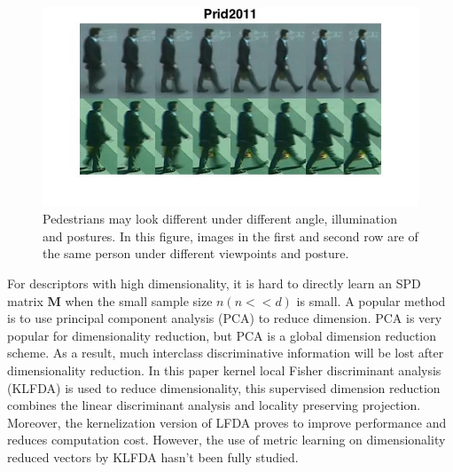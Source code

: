 \documentclass[10pt,twocolumn,letterpaper]{article}
\begin{document}
\begin{figure} 
\centering
\includegraphics[width=1\linewidth]{DisimilarIntra.jpg}
\vspace{-2em}
\caption{Pedestrians may look different under different angle, illumination and postures. In this figure, images in the first and second row are of the same person under different viewpoints and posture.}
\label{DisimilarIntra}
\end{figure}
\indent For descriptors with high dimensionality, it is hard to directly learn an SPD matrix $\bm{M}$ when the small sample size $n (n<<d)$ is small. A popular method is to use principal component analysis (PCA) to reduce dimension. PCA is very popular for dimensionality reduction, but PCA is a global dimension reduction scheme. As a result, much interclass discriminative information will be lost after dimensionality reduction. In this paper kernel local Fisher discriminant analysis (KLFDA) \cite{KernelVersionMetrics} is used to reduce dimensionality, this supervised dimension reduction combines the linear discriminant analysis and locality preserving projection. Moreover, the kernelization version of LFDA proves to improve performance and reduces computation cost. However, the use of metric learning on dimensionality reduced vectors by KLFDA hasn't been fully studied.\\
\end{document}
